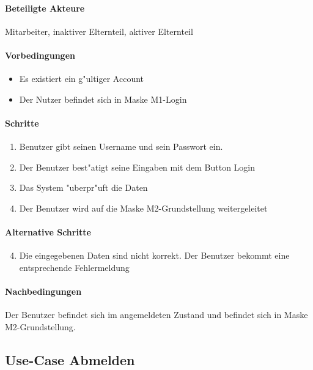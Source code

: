   \paragraph{Beteiligte Akteure}   \leavevmode \newline
    Mitarbeiter, inaktiver Elternteil, aktiver Elternteil
  \paragraph{Vorbedingungen}
  \begin{itemize}
   \item Es existiert ein g"ultiger Account
   \item Der Nutzer befindet sich in Maske M1-Login
  \end{itemize}

  \paragraph{Schritte}
  \begin{enumerate}
   \item Benutzer gibt seinen Username und sein Passwort ein.
   \item Der Benutzer best"atigt seine Eingaben mit dem Button \dq Login\dq
   \item Das System "uberpr"uft die Daten
   \item Der Benutzer wird auf die Maske M2-Grundstellung weitergeleitet
  \end{enumerate}

  \paragraph{Alternative Schritte}
  \begin{enumerate}
   \setcounter{enumi}{3}
   \item Die eingegebenen Daten sind nicht korrekt. Der Benutzer bekommt eine entsprechende Fehlermeldung
  \end{enumerate}

  \paragraph{Nachbedingungen}
    Der Benutzer befindet sich im angemeldeten Zustand und befindet sich in Maske M2-Grundstellung.

  
 \newpage
 \subsection{Use-Case Abmelden}
